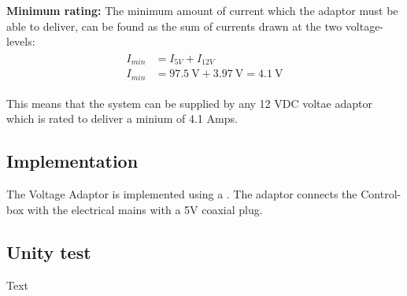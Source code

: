 \textbf{Minimum rating:} The minimum amount of current which the adaptor must be able to deliver, can be found as the sum of currents drawn at the two voltage-levels:
\begin{align}
	\begin{split}
		I_{min} &= I_{5V} + I_{12V}\\
		I_{min} &= \SI{97.5}{\volt} + \SI{3.97}{\volt} = \SI{4.1}{\volt}
	\end{split}
\end{align}

This means that the system can be supplied by any 12 VDC voltae adaptor which is rated to deliver a minium of 4.1 Amps.

\subsection{Implementation}
The Voltage Adaptor is implemented using a . The adaptor connects the Control-box with the electrical mains with a 5V coaxial plug. 

\subsection{Unity test}
Text